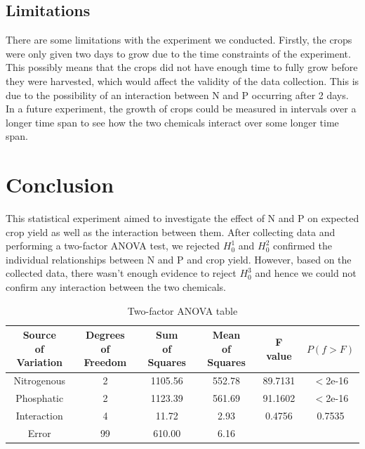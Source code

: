 \documentclass[12pt]{article}
\begin{document}
\subsection{Limitations}

There are some limitations with the experiment we conducted.
Firstly, the crops were only given two days to grow due to the time constraints of the experiment.
This possibly means that the crops did not have enough time to fully grow before they were harvested, which would affect the validity of the data collection.
This is due to the possibility of an interaction between N and P occurring after 2 days.
In a future experiment, the growth of crops could be measured in intervals over a longer time span to see how the two chemicals interact over some longer time span.

\section{Conclusion}

This statistical experiment aimed to investigate the effect of N and P on expected crop yield as well as the interaction between them.
After collecting data and performing a two-factor ANOVA test, we rejected $H^1_0$ and $H^2_0$ confirmed the individual relationships between N and P and crop yield.
However, based on the collected data, there wasn't enough evidence to reject $H^3_0$ and hence we could not confirm any interaction between the two chemicals.


\newpage

\printbibliography

\newpage

\appendix

\begin{table}[ht]
    \centering
    \caption{Two-factor ANOVA table}
    \begin{tabular}{cccccc}
    \hline
    \makecell{Source\\ of Variation} & \makecell{Degrees\\ of Freedom} & \makecell{Sum\\ of Squares} &  \makecell{Mean\\ of Squares} & F value & \(P(f > F)\)\\ \hline
    Nitrogenous & 2 & 1105.56 & 552.78 & 89.7131 & \(<\)2e-16\\
    Phosphatic & 2 & 1123.39 & 561.69 & 91.1602 & \(<\)2e-16\\
    Interaction & 4 & 11.72 & 2.93 & 0.4756 & 0.7535\\
    Error & 99 & 610.00 & 6.16\\ \hline
    \end{tabular}
\end{table}
\end{document}
